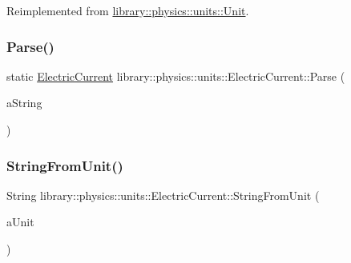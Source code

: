Reimplemented from \hyperlink{classlibrary_1_1physics_1_1units_1_1_unit_a5ce011c1ffa0fce4cf1f5d42ff06ee78}{library\+::physics\+::units\+::\+Unit}.

\mbox{\label{classlibrary_1_1physics_1_1units_1_1_electric_current_acf532c6c33b8c8e580e062aa4d15b069}} 
\subsubsection{\texorpdfstring{Parse()}{Parse()}}
{\footnotesize\ttfamily static \hyperlink{classlibrary_1_1physics_1_1units_1_1_electric_current}{Electric\+Current} library\+::physics\+::units\+::\+Electric\+Current\+::\+Parse (\begin{DoxyParamCaption}\item[{const String \&}]{a\+String }\end{DoxyParamCaption})\hspace{0.3cm}{\ttfamily [static]}}

\mbox{\label{classlibrary_1_1physics_1_1units_1_1_electric_current_adfc04e139353ede136d9dd4e0e256222}} 
\subsubsection{\texorpdfstring{String\+From\+Unit()}{StringFromUnit()}}
{\footnotesize\ttfamily String library\+::physics\+::units\+::\+Electric\+Current\+::\+String\+From\+Unit (\begin{DoxyParamCaption}\item[{const \hyperlink{classlibrary_1_1physics_1_1units_1_1_electric_current_a9498eabf964f0ae6116eb627b4ec5233}{Electric\+Current\+::\+Unit} \&}]{a\+Unit }\end{DoxyParamCaption})\hspace{0.3cm}{\ttfamily [static]}}

